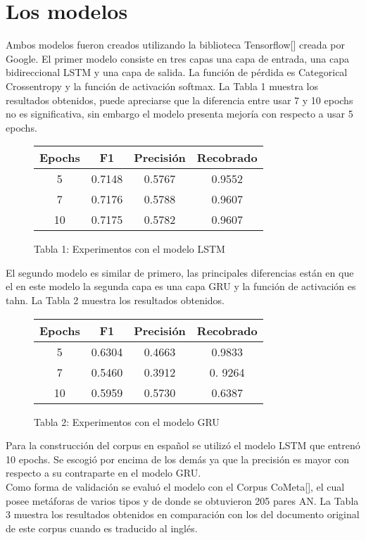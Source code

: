 \section{Los modelos}
Ambos modelos fueron creados utilizando la biblioteca Tensorflow[\cite{tensorflow2015-whitepaper}] creada por Google.
El primer modelo consiste en tres capas una capa de entrada, una capa bidireccional LSTM y una capa de salida. La función de pérdida es Categorical Crossentropy y la función de activación softmax. La Tabla 1 muestra los resultados obtenidos, puede apreciarse que la diferencia entre usar 7 y 10 epochs no es significativa, sin embargo el modelo presenta mejoría con respecto a usar 5 epochs.
\begin{figure}[htb]%
\begin{tabular}{c|c|c|c}
Epochs & F1 & Precisión & Recobrado\\
\hline
5 & 0.7148 & 0.5767 & 0.9552\\
\hline
7 & 0.7176 & 0.5788 & 0.9607\\
\hline
10 & 0.7175 & 0.5782 & 0.9607\\
\hline
\end{tabular}
\caption{Tabla 1: Experimentos con el modelo LSTM \label{Tabla:1}}%
\end{figure}
El segundo modelo es similar de primero, las principales diferencias están en que el en este modelo la segunda capa es una capa GRU y la función de activación es tahn. La Tabla 2 muestra los resultados obtenidos.\\
\begin{figure}[htb]%
\begin{tabular}{c|c|c|c}
Epochs & F1 & Precisión & Recobrado\\
\hline
5 & 0.6304 & 0.4663 & 0.9833\\
\hline
7 & 0.5460 & 0.3912 & 0. 9264\\
\hline
10 & 0.5959 & 0.5730 & 0.6387\\
\hline
\end{tabular}
\caption{Tabla 2: Experimentos con el modelo GRU \label{Tabla:2}}%
\end{figure}
Para la construcción del corpus en español se utilizó el modelo LSTM que entrenó 10 epochs. Se escogió por encima de los demás ya que la precisión es mayor con respecto a su contraparte en el modelo GRU.\\
Como forma de validación se evaluó el modelo con el Corpus CoMeta[\cite{Sánchez}], el cual posee metáforas de varios tipos y de donde se obtuvieron 205 pares AN. La Tabla 3 muestra los resultados obtenidos en comparación con los del documento original de este corpus cuando es traducido al inglés.\\
